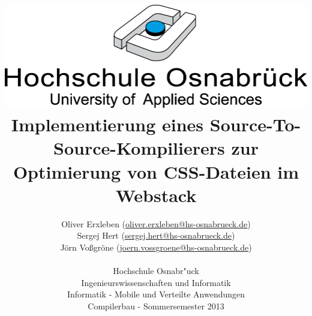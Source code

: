 \documentclass[11pt]{scrartcl}
\begin{document}
\author{%
	Oliver Erxleben \small(\href{mailto:oliver.erxleben@hs-osnabrueck.de}{oliver.erxleben@hs-osnabrueck.de})\\%
	Sergej Hert \small(\href{mailto:sergej.hert@hs-osnabrueck.de}{sergej.hert@hs-osnabrueck.de})\\%
	Jörn Voßgröne \small(\href{mailto:joern.vossgroene@hs-osnabrueck.de}{joern.vossgroene@hs-osnabrueck.de})\\
	\\%
	Hochschule Osnabr"uck \\%
	Ingenieurswissenschaften und Informatik \\%
	Informatik - Mobile und Verteilte Anwendungen\\
	Compilerbau - Sommersemester 2013 }

\title{\includegraphics[scale=0.75,keepaspectratio]{img/hs_os.png}\linebreak \linebreak Implementierung eines Source-To-Source-Kompilierers zur Optimierung von CSS-Dateien im Webstack}

\maketitle
\thispagestyle{empty}
\pagebreak
\tableofcontents
\listoffigures

\lstlistoflistings
\thispagestyle{empty}
\pagebreak
\thispagestyle{empty}
\end{document}
